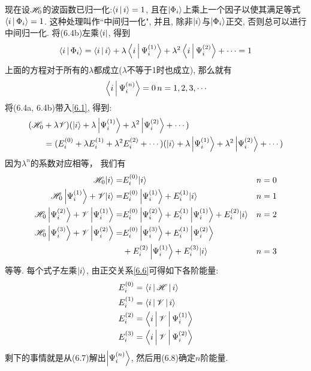 现在设$\mathscr{H}_0$的波函数已归一化:$\Braket{i|i}=1$, 
且在$\Ket{\Phi_i}$上乘上一个因子以使其满足等式$\Braket{i|\Phi_i}=1$. 
这种处理叫作``中间归一化", 
并且, 
除非$\Ket{i}$与$\Ket{\Phi_i}$正交, 
否则总可以进行中间归一化. 
将(6.4b)左乘$\Bra{i}$, 
得到
\begin{align}
\Braket{i|\Phi_i}=\Braket{i|i}+\lambda\Braket{i|\Psi_i^{(1)}}+\lambda^2\Braket{i|\Psi_i^{(2)}} + \cdots = 1
\end{align}
上面的方程对于所有的$\lambda$都成立($\lambda$不等于1时也成立), 
那么就有
\begin{align}
\braket{i|\Psi_i^{(n)}} = 0\, \hfill n=1,2,3,\cdots
\label{6.6}
\end{align}
将(6.4a,
6.4b)带入\autoref{6.1}, 
得到:
\begin{align*}
(\mathscr{H}_0&+\lambda\mathscr{V})(\Ket{i}+\lambda\Ket{\Psi_i^{(1)}} + \lambda^2 \Ket{\Psi_i^{(2)}} +\cdots )\\
&=(E_i^{(0)} + \lambda E_i^{(1)} + \lambda^2 E_i^{(2)}  + \cdots )(\Ket{i}+\lambda\Ket{\Psi_i^{(1)}} + \lambda^2 \Ket{\Psi_i^{(2)}} +\cdots)
\end{align*}
因为$\lambda^n$的系数对应相等，
我们有
\begin{subequations}
	\begin{align}
		\mathscr{H}_0|i\rangle=& E_i^{(0)}|i\rangle & & n=0 \\
		\mathscr{H}_0\left|\Psi_i^{(1)}\right\rangle+\mathscr{V}|i\rangle=& E_i^{(0)}\left|\Psi_i^{(1)}\right\rangle+E_i^{(1)}|i\rangle & & n=1 \\
		\mathscr{H}_0\left|\Psi_i^{(2)}\right\rangle+\mathscr{V}\left|\Psi_i^{(1)}\right\rangle=& E_i^{(0)}\left|\Psi_i^{(2)}\right\rangle+E_i^{(1)}\left|\Psi_i^{(1)}\right\rangle+E_i^{(2)}|i\rangle & & n=2 \\
		\mathscr{H}_0\left|\Psi_i^{(3)}\right\rangle+\mathscr{V}\left|\Psi_i^{(2)}\right\rangle=& E_i^{(0)}\left|\Psi_i^{(3)}\right\rangle+E_i^{(1)}\left|\Psi_i^{(2)}\right\rangle & \notag \\
		&+E_i^{(2)}\left|\Psi_i^{(1)}\right\rangle+E_i^{(3)}|i\rangle & & n=3
	\end{align}
\end{subequations}
等等. 
每个式子左乘$\Ket{i}$, 
由正交关系\autoref{6.6}可得如下各阶能量:
\begin{subequations}
\begin{align}
E_i^{(0)} &= \Braket{i|\mathscr{H}|i} \\
E_i^{(1)} &= \Braket{i|\mathscr{V}|i} \\
E_i^{(2)} &= \Braket{i|\mathscr{V}|\Psi_i^{(1)}} \\
E_i^{(3)} &= \Braket{i|\mathscr{V}|\Psi_i^{(2)}}
\end{align}
\end{subequations}
剩下的事情就是从(6.7)解出$\Ket{\Psi_i^{(n)}}$, 
然后用(6.8)确定$n$阶能量.


